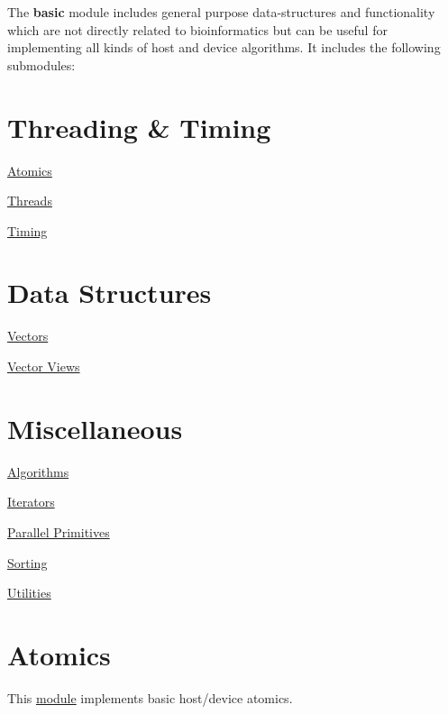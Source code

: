 

The {\bfseries basic} module includes general purpose data-\/structures and functionality which are not directly related to bioinformatics but can be useful for implementing all kinds of host and device algorithms. It includes the following submodules\+:\hypertarget{basic_page_ThreadingAndTiming}{}\section{Threading \& Timing}\label{basic_page_ThreadingAndTiming}

\begin{DoxyItemize}
\item \hyperlink{atomics_page}{Atomics}
\item \hyperlink{threads_page}{Threads}
\item \hyperlink{timing_page}{Timing} 
\end{DoxyItemize}\hypertarget{basic_page_DataStructures}{}\section{Data Structures}\label{basic_page_DataStructures}

\begin{DoxyItemize}
\item \hyperlink{vectors_page}{Vectors}
\item \hyperlink{vector_views_page}{Vector Views} 
\end{DoxyItemize}\hypertarget{basic_page_Miscellaneous}{}\section{Miscellaneous}\label{basic_page_Miscellaneous}

\begin{DoxyItemize}
\item \hyperlink{algorithms_page}{Algorithms}
\item \hyperlink{iterators_page}{Iterators}
\item \hyperlink{primitives_page}{Parallel Primitives}
\item \hyperlink{sorting_page}{Sorting}
\item \hyperlink{utilities_page}{Utilities} 
\end{DoxyItemize}\hypertarget{atomics_page}{}\section{Atomics}\label{atomics_page}
\begin{DoxyParagraph}{}
This \hyperlink{group___atomics}{module} implements basic host/device atomics.
\end{DoxyParagraph}

